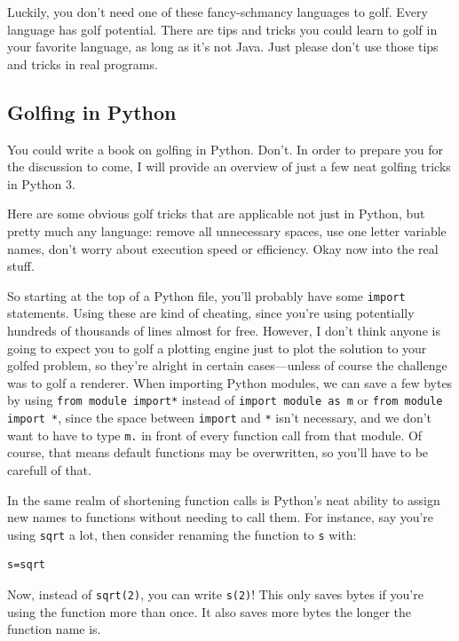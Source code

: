 \documentclass[12pt,twocolumn]{article}
\begin{document}
Luckily, you don't need one of these fancy-schmancy languages to golf. Every language has golf potential. There are tips and tricks you could learn to golf in your favorite language, as long as it's not Java. Just please don't use those tips and tricks in real programs.
\subsection{Golfing in Python}
You could write a book on golfing in Python. Don't. In order to prepare you for the discussion to come, I will provide an overview of just a few neat golfing tricks in Python 3.

Here are some obvious golf tricks that are applicable not just in Python, but pretty much any language: remove all unnecessary spaces, use one letter variable names, don't worry about execution speed or efficiency. Okay now into the real stuff.

So starting at the top of a Python file, you'll probably have some \texttt{import} statements. Using these are kind of cheating, since you're using potentially hundreds of thousands of lines almost for free. However, I don't think anyone is going to expect you to golf a plotting engine just to plot the solution to your golfed problem, so they're alright in certain cases---unless of course the challenge was to golf a renderer. When importing Python modules, we can save a few bytes by using \texttt{from module import*} instead of \texttt{import module as m} or \texttt{from module import *}, since the space between \texttt{import} and \texttt{*} isn't necessary, and we don't want to have to type \texttt{m.} in front of every function call from that module. Of course, that means default functions may be overwritten, so you'll have to be carefull of that.

In the same realm of shortening function calls is Python's neat ability to assign new names to functions without needing to call them. For instance, say you're using \texttt{sqrt} a lot, then consider renaming the function to \texttt{s} with:
\begin{verbatim}
s=sqrt
\end{verbatim}
Now, instead of \texttt{sqrt(2)}, you can write \texttt{s(2)}! This only saves bytes if you're using the function more than once. It also saves more bytes the longer the function name is.
\end{document}
